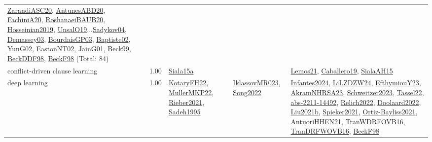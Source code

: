{\begin{longtable}{p{3cm}r>{\raggedright\arraybackslash}p{6cm}>{\raggedright\arraybackslash}p{6cm}>{\raggedright\arraybackslash}p{8cm}}
\hyperref[detail:ZarandiASC20]{ZarandiASC20}, \hyperref[detail:AntunesABD20]{AntunesABD20}, \hyperref[detail:FachiniA20]{FachiniA20}, \hyperref[detail:RoshanaeiBAUB20]{RoshanaeiBAUB20}, \hyperref[detail:Hosseinian2019]{Hosseinian2019}, \hyperref[detail:UnsalO19]{UnsalO19}...\hyperref[detail:Sadykov04]{Sadykov04}, \hyperref[detail:Demassey03]{Demassey03}, \hyperref[detail:BourdaisGP03]{BourdaisGP03}, \hyperref[detail:Baptiste02]{Baptiste02}, \hyperref[detail:YunG02]{YunG02}, \hyperref[detail:EastonNT02]{EastonNT02}, \hyperref[detail:JainG01]{JainG01}, \hyperref[detail:Beck99]{Beck99}, \hyperref[detail:BeckDDF98]{BeckDDF98}, \hyperref[detail:BeckF98]{BeckF98} (Total: 84)\\
\index{conflict-driven clause learning}\index{Algorithms!conflict-driven clause learning}conflict-driven clause learning &  1.00 & \hyperref[detail:Siala15a]{Siala15a} &  & \hyperref[detail:Lemos21]{Lemos21}, \hyperref[detail:Caballero19]{Caballero19}, \hyperref[detail:SialaAH15]{SialaAH15}\\
\index{deep learning}\index{Algorithms!deep learning}deep learning &  1.00 & \hyperref[detail:KotaryFH22]{KotaryFH22}, \hyperref[detail:MullerMKP22]{MullerMKP22}, \hyperref[detail:Rieber2021]{Rieber2021}, \hyperref[detail:Sadeh1995]{Sadeh1995} & \hyperref[detail:IklassovMR023]{IklassovMR023}, \hyperref[detail:Song2022]{Song2022} & \hyperref[detail:Infantes2024]{Infantes2024}, \hyperref[detail:LiLZDZW24]{LiLZDZW24}, \hyperref[detail:EfthymiouY23]{EfthymiouY23}, \hyperref[detail:AkramNHRSA23]{AkramNHRSA23}, \hyperref[detail:Schweitzer2023]{Schweitzer2023}, \hyperref[detail:Tassel22]{Tassel22}, \hyperref[detail:abs-2211-14492]{abs-2211-14492}, \hyperref[detail:Relich2022]{Relich2022}, \hyperref[detail:Doolaard2022]{Doolaard2022}, \hyperref[detail:Liu2021b]{Liu2021b}, \hyperref[detail:Spieker2021]{Spieker2021}, \hyperref[detail:Ortiz-Bayliss2021]{Ortiz-Bayliss2021}, \hyperref[detail:AntuoriHHEN21]{AntuoriHHEN21}, \hyperref[detail:TranWDRFOVB16]{TranWDRFOVB16}, \hyperref[detail:TranDRFWOVB16]{TranDRFWOVB16}, \hyperref[detail:BeckF98]{BeckF98}\\

\end{longtable}}
